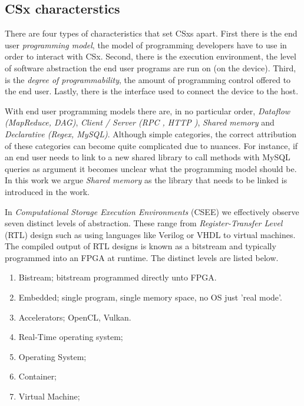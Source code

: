 

\subsection{CSx characterstics}

There are four types of characteristics that set CSxs apart. First there is
the end user \textit{programming model}, the model of programming developers
have to use in order to interact with CSx. Second, there is the execution
environment, the level of software abstraction the end user programs are run on
(on the device). Third, is the \textit{degree of programmability}, the amount of
programming control offered to the end user. Lastly, there is the interface used
to connect the device to the host.

With end user programming models there are, in no particular order,
\textit{Dataflow (MapReduce, DAG)}, \textit{Client / Server
(RPC \footnotemark[1], HTTP \footnotemark[2])}, \textit{Shared memory} and
\textit{Declarative (Regex, MySQL)}. Although simple categories, the correct
attribution of these categories can become quite complicated due to nuances. For
instance, if an end user needs to link to a new shared library to call methods
with MySQL queries as argument it becomes unclear what the programming model
should be. In this work we argue \textit{Shared memory} as the library that
needs to be linked is introduced in the work.



In \textit{Computational Storage Execution Environments} (CSEE) we effectively
observe seven distinct levels of abstraction. These range from
\textit{Register-Transfer Level} (RTL) design such as using languages like
Verilog or VHDL to virtual machines. The compiled output of RTL designs is known
as a bitstream and typically programmed into an FPGA at runtime. The distinct
levels are listed below.

\begin{enumerate}
    \item Bistream; bitstream programmed directly unto FPGA.
    \item Embedded; single program, single memory space, no OS just 'real mode'.
    \item Accelerators; OpenCL, Vulkan.
    \item Real-Time operating system;
    \item Operating System;
    \item Container;
    \item Virtual Machine;
\end{enumerate}

